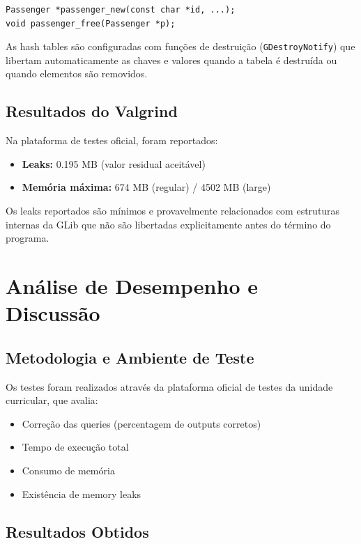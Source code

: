 \documentclass[a4paper,12pt]{scrreprt}
\begin{document}
\begin{lstlisting}
Passenger *passenger_new(const char *id, ...);
void passenger_free(Passenger *p);
\end{lstlisting}

As hash tables são configuradas com funções de destruição (\texttt{GDestroyNotify}) que libertam automaticamente as chaves e valores quando a tabela é destruída ou quando elementos são removidos.

\section{Resultados do Valgrind}

Na plataforma de testes oficial, foram reportados:

\begin{itemize}
    \item \textbf{Leaks:} 0.195 MB (valor residual aceitável)
    \item \textbf{Memória máxima:} 674 MB (regular) / 4502 MB (large)
\end{itemize}

Os leaks reportados são mínimos e provavelmente relacionados com estruturas internas da GLib que não são libertadas explicitamente antes do término do programa.


\chapter{Análise de Desempenho e Discussão}

\section{Metodologia e Ambiente de Teste}

Os testes foram realizados através da plataforma oficial de testes da unidade curricular, que avalia:
\begin{itemize}
    \item Correção das queries (percentagem de outputs corretos)
    \item Tempo de execução total
    \item Consumo de memória
    \item Existência de memory leaks
\end{itemize}

\section{Resultados Obtidos}
\end{document}
